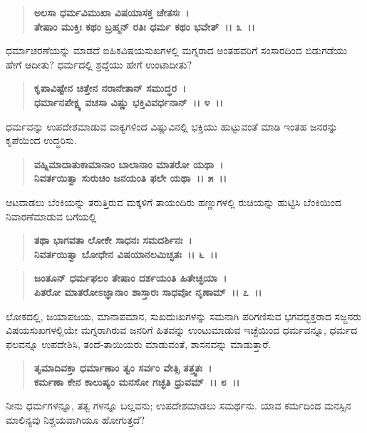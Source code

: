 \begin{verse}
\textbf{ಅಲಸಾ ಧರ್ಮವಿಮುಖಾ ವಿಷಯಾಸಕ್ತ ಚೇತಸಃ~।}\\\textbf{ತೇಷಾಂ ಮುಕ್ತಿಃ ಕಥಂ ಬ್ರಹ್ಮನ್ ರತಿಃ ಧರ್ಮ ಕಥಂ ಭವೇತ್~।। ೩~।।}
\end{verse}

ಧರ್ಮಾಚರಣೆಯನ್ನು ಮಾಡದೆ ಐಹಿಕವಿಷಯಸುಖಗಳಲ್ಲಿ ಮಗ್ನರಾದ ಅಂತಹವರಿಗೆ ಸಂಸಾರದಿಂದ ಬಿಡುಗಡೆಯು ಹೇಗೆ ಆದೀತು? ಧರ್ಮದಲ್ಲಿ ಶ್ರದ್ದೆಯು ಹೇಗೆ ಉಂಟಾದೀತು?

\begin{verse}
\textbf{ಕೃಪಾವಿಷ್ಟೇನ ಚಿತ್ತೇನ ನರಾನೇತಾನ್ ಸಮುದ್ಧರ~।}\\\textbf{ಧರ್ಮಾನಪೇಕ್ಷ್ಯ ವಚಸಾ ವಿಷ್ಣು ಭಕ್ತಿವಿವರ್ಧನಾನ್~।। ೪~।।}
\end{verse}

ಧರ್ಮವನ್ನು ಉಪದೇಶಮಾಡುವ ವಾಕ್ಯಗಳಿಂದ ವಿಷ್ಣುವಿನಲ್ಲಿ ಭಕ್ತಿಯು ಹುಟ್ಟುವಂತೆ ಮಾಡಿ ಇಂತಹ ಜನರನ್ನು ಕೃಪೆಯಿಂದ ಉದ್ಧರಿಸು.

\begin{verse}
\textbf{ವಹ್ನಿಮಾದಾತುಕಾಮಾನಾಂ ಬಾಲಾನಾಂ ಮಾತರೋ ಯಥಾ~।}\\\textbf{ನಿವರ್ತಯಿತ್ವಾ ಸುರುಚಿಂ ಜನಯಂತಿ ಫಲೇ ಯಥಾ~।। ೫~।।}
\end{verse}

ಆಟವಾಡಲು ಬೆಂಕಿಯನ್ನು ತರುತ್ತಿರುವ ಮಕ್ಕಳಿಗೆ ತಾಯಂದಿರು ಹಣ್ಣುಗಳಲ್ಲಿ ರುಚಿಯನ್ನು ಹುಟ್ಟಿಸಿ ಬೆಂಕಿಯಿಂದ ನಿವಾರಣೆಮಾಡುವ ಬಗೆಯಲ್ಲಿ

\begin{verse}
\textbf{ತಥಾ ಭಾಗವತಾ ಲೋಕೇ ಸಾಧನಃ ಸಮದರ್ಶಿನಃ~।}\\\textbf{ನಿವರ್ತಯಿತ್ವಾ ಬೋಧೇನ ವಿಷಯಾನಲಮಿಚ್ಛತಃ~।। ೬~।।}
\end{verse}

\begin{verse}
\textbf{ಜಂತೂನ್ ಧರ್ಮಫಲಂ ತೇಷಾಂ ದರ್ಶಯಂತಿ ಹಿತೇಚ್ಛಯಾ~।}\\\textbf{ಪಿತರೋ ಮಾತರೋಽಜ್ಞಾನಾಂ ಶಾಸ್ತಾರಃ ಸಾಧವೋ ನೃಣಾಮ್~।। ೭~।।}
\end{verse}

ಲೋಕದಲ್ಲಿ, ಜಯಾಪಜಯ, ಮಾನಾಪಮಾನ, ಸುಖದುಃಖಗಳನ್ನು ಸಮನಾಗಿ ಪರಿಗಣಿಸುವ ಭಗವದ್ಭಕ್ತರಾದ ಸಜ್ಜನರು ವಿಷಯಸುಖಗಳಲ್ಲಿಯೇ ಮಗ್ನರಾಗಿರುವ ಜನರಿಗೆ ಹಿತವನ್ನು ಉಂಟುಮಾಡುವ ಇಚ್ಛೆಯಿಂದ ಧರ್ಮವನ್ನೂ, ಧರ್ಮದ ಫಲವನ್ನೂ ಉಪದೇಶಿಸಿ, ತಂದೆ-ತಾಯಿಯರು ಮಾಡುವಂತೆ, ಶಾಸನವನ್ನು ಮಾಡುತ್ತಾರೆ.

\begin{verse}
\textbf{ತೃಮಾದಿವಕ್ತಾ ಧರ್ಮಾಣಾಂ ತ್ವಂ ಸರ್ವಂ ವೇತ್ಸಿ ತತ್ತ್ವತಃ~।}\\\textbf{ಕರ್ಮಣಾ ಕೇನ ಕಾಲುಷ್ಯಂ ಮನಸೋ ಗಚ್ಛತಿ ಧ್ರುವಮ್~।। ೮~।।}
\end{verse}

ನೀನು ಧರ್ಮಗಳನ್ನೂ, ತತ್ವ ಗಳನ್ನೂ ಬಲ್ಲವನು; ಉಪದೇಶಮಾಡಲು ಸಮರ್ಥನು. ಯಾವ ಕರ್ಮದಿಂದ ಮನಸ್ಸಿನ ಮಾಲಿನ್ಯವು ನಿಶ್ಚಯವಾಗಿಯೂ ಹೋಗುತ್ತದೆ?

